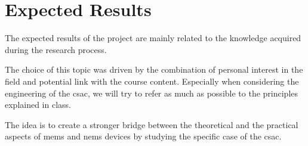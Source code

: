 \section{Expected Results}

The expected results of the project are mainly related to the knowledge acquired during the research process.

The choice of this topic was driven by the combination of personal interest in the field and potential link with the course content.
Especially when considering the engineering of the \acrfull{csac}, we will try to refer as much as possible to the principles explained in class.

The idea is to create a stronger bridge between the theoretical and the practical aspects of \acrshort{mems} and \acrshort{nems} devices by studying the specific case of the \acrshort{csac}.
